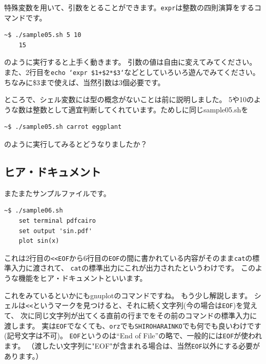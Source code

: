 \documentclass[a4j]{ltjsreport}
\begin{document}
    特殊変数を用いて、引数をとることができます。\texttt{expr}は整数の四則演算をするコマンドです。
    
    \begin{lstlisting}[numbers=none]
    ~$ ./sample05.sh 5 10
    15
    \end{lstlisting}
    のように実行すると上手く動きます。
    引数の値は自由に変えてみてください。
    また、2行目を\texttt{echo `expr \$1+\$2*\$3`}などとしていろいろ遊んでみてください。
    ちなみに\$3まで使えば、当然引数は3個必要です。

    ところで、シェル変数には型の概念がないことは前に説明しました。
    5や10のような数は整数として適宜判断してくれています。ためしに同じsample05.shを
    \begin{lstlisting}[numbers=none]
    ~$ ./sample05.sh carrot eggplant
    \end{lstlisting}
    のように実行してみるとどうなりましたか？

    \subsection{ヒア・ドキュメント}
    またまたサンプルファイルです。
    

    \begin{lstlisting}[numbers=none]
    ~$ ./sample06.sh 
    set terminal pdfcairo
    set output 'sin.pdf'
    plot sin(x)
    \end{lstlisting}

    これは2行目の\texttt{<<EOF}から6行目の\texttt{EOF}の間に書かれている内容がそのまま\texttt{cat}の標準入力に渡されて、
    \texttt{cat}の標準出力にこれが出力されたというわけです。
    このような機能をヒア・ドキュメントといいます。

    これをみているといかにもgnuplotのコマンドですね。
    もう少し解説します。
    シェルは\texttt{<<}というマークを見つけると、それに続く文字列(今の場合は\texttt{EOF})を覚えて、
    次に同じ文字列が出てくる直前の行までをその前のコマンドの標準入力に渡します。
    実は\texttt{EOF}でなくても、\texttt{orz}でも\texttt{SHIROHARAINKO}でも何でも良いわけです(記号文字は不可)。
    \texttt{EOF}というのは``End of File''の略で、一般的には\texttt{EOF}が使われます。
    （渡したい文字列に"EOF"が含まれる場合は、当然\texttt{EOF}以外にする必要があります。）
\end{document}
